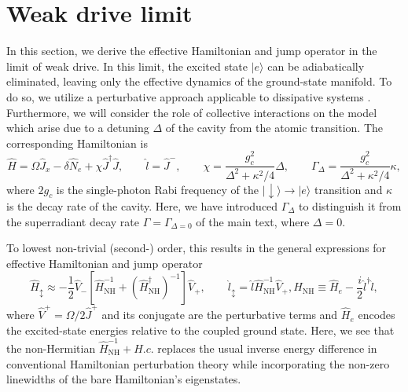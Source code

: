 \documentclass[11pt]{article}
\begin{document}
\section{Weak drive limit}
\label{sec:weak}

In this section, we derive the effective Hamiltonian and jump operator in the limit of weak drive. In this limit, the excited state $|e\rangle$ can be adiabatically eliminated, leaving only the effective dynamics of the ground-state manifold. To do so, we utilize a perturbative approach applicable to dissipative systems \cite{Reiter2012}. Furthermore, we will consider the role of collective interactions on the model which arise due to a detuning $\Delta$ of the cavity from the atomic transition. The corresponding Hamiltonian is
\begin{equation}
    \hat H = \Omega \hat J_x - \delta \hat N_e + \chi \hat J^\dagger \hat J, \qquad \hat l = \hat J^-, \qquad \chi = \frac{g_c^2}{\Delta^2+\kappa^2/4} \Delta, \qquad \Gamma_{\Delta} = \frac{g_c^2}{\Delta^2+\kappa^2/4} \kappa, 
\end{equation}
where $2 g_c$ is the single-photon Rabi frequency of the $|{\downarrow}\rangle \to |e\rangle$ transition and $\kappa$ is the decay rate of the cavity. Here, we have introduced $\Gamma_{\Delta}$ to distinguish it from the superradiant decay rate $\Gamma = \Gamma_{\Delta = 0}$ of the main text, where $\Delta = 0$.

To lowest non-trivial (second-) order, this results in the general expressions for effective Hamiltonian and jump operator 
\begin{subequations}
\begin{equation}
    \hat H_\updownarrow \approx - \frac{1}{2} \hat V_- [\hat H_{{{\text{NH}}}}^{-1} + (\hat H_{{{\text{NH}}}}^\dagger)^{-1}]\hat V_+, \qquad \hat l_\updownarrow = \hat l \hat H_{{{\text{NH}}}}^{-1} \hat V_+,
\end{equation}
\begin{equation}
    \hat H_{\text{NH}} \equiv \hat H_e - \frac{i}{2} \hat l^\dagger \hat l,
\end{equation}
\end{subequations}
where $\hat V^+ = \Omega/2 \hat J^+$ and its conjugate are the perturbative terms and $\hat H_e$ encodes the excited-state energies relative to the coupled ground state. Here, we see that the non-Hermitian $\hat{H}_{\text{NH}}^{-1} + H.c.$ replaces the usual inverse energy difference in conventional Hamiltonian perturbation theory while incorporating the non-zero linewidths of the bare Hamiltonian's eigenstates.
\end{document}
